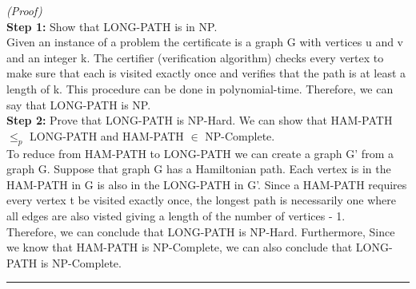 \documentclass{article}
\begin{document}
\noindent\textit{(Proof)}
\\[.25cm]
\textbf{Step 1: }Show that LONG-PATH is in NP.
\\[.25cm]
Given an instance of a problem the certificate is a graph G with vertices u and v and an integer k. The certifier (verification algorithm) checks every vertex to make sure that each is visited exactly once and verifies that the path is at least a length of k. This procedure can be done in polynomial-time. Therefore, we can say that LONG-PATH is NP.
\\[.25cm]
\textbf{Step 2: }Prove that LONG-PATH is NP-Hard. We can show that HAM-PATH $\leq _p$ LONG-PATH and HAM-PATH $\in$ NP-Complete. 
\\[.25cm]
To reduce from HAM-PATH to LONG-PATH we can create a graph G' from a graph G. Suppose that graph G has a Hamiltonian path. Each vertex is in the HAM-PATH in G is also in the LONG-PATH in G'. Since a HAM-PATH requires every vertex t be visited exactly once, the longest path is necessarily one where all edges are also visted giving a length of the number of vertices - 1.\\

Therefore, we can conclude that LONG-PATH is NP-Hard. Furthermore, Since we know that HAM-PATH is NP-Complete, we  can also conclude that LONG-PATH is NP-Complete. 
\\[.25cm]

\noindent\rule{8cm}{0.4pt}
\\[.25cm]
\end{document}
